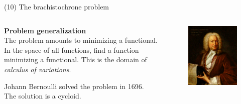 \documentclass[11pt, aspectratio=149]{beamer}
\theoremstyle{plain}
\begin{document}
\begin{frame}[fragile, t]{(10) The brachistochrone problem}
	\begin{columns}
		\begin{column}{0.55\textwidth}
			\textbf{Problem generalization}
			\\ \vspace*{0.5em} 
			The problem amounts to minimizing a functional.
			In the space of all functions, find a function minimizing a functional.
			This is the domain of \emph{calculus of variations}.
			\vspace*{1em}
			
			Johann Bernoulli solved the problem in 1696.
			The solution is a cycloid.
		\end{column}
		\begin{column}{0.45\textwidth}%
			\begin{figure}
				\centering
				\includegraphics[width=0.8\linewidth]{figs/Johann_Bernoulli.jpg}
			\end{figure}
		\end{column}
	\end{columns}
\end{frame}
\end{document}
